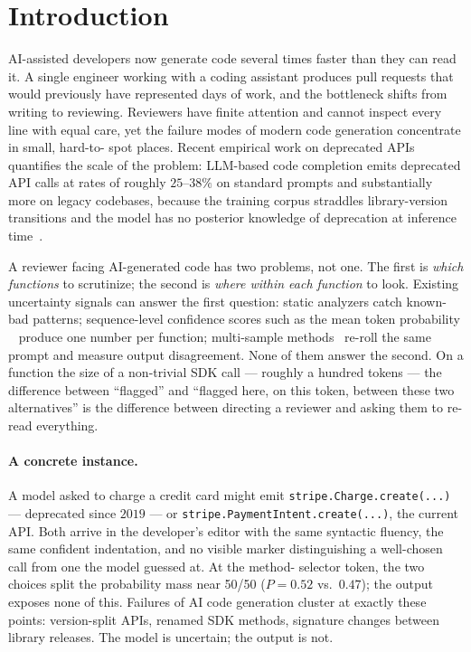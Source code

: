 \section{Introduction}
\label{sec:introduction}

AI-assisted developers now generate code several times faster than they
can read it. A single engineer working with a coding assistant produces
pull requests that would previously have represented days of work, and
the bottleneck shifts from writing to reviewing. Reviewers have finite
attention and cannot inspect every line with equal care, yet the
failure modes of modern code generation concentrate in small, hard-to-%
spot places. Recent empirical work on deprecated APIs quantifies the
scale of the problem: LLM-based code completion emits deprecated API
calls at rates of roughly $25$--$38\%$ on standard prompts and
substantially more on legacy codebases, because the training corpus
straddles library-version transitions and the model has no posterior
knowledge of deprecation at inference time~\cite{wang2025deprecated}.

A reviewer facing AI-generated code has two problems, not one. The
first is \emph{which functions} to scrutinize; the second is \emph{where
within each function} to look. Existing uncertainty signals can answer
the first question: static analyzers catch known-bad patterns;
sequence-level confidence scores such as the mean token probability
\papg~\cite{spiess2025calibration} produce one number per function;
multi-sample methods~\cite{kuhn2023semantic,uqlm2024,sharma2025multisample}
re-roll the same prompt and measure output disagreement. None of them
answer the second. On a function the size of a non-trivial SDK call
--- roughly a hundred tokens --- the difference between ``flagged''
and ``flagged here, on this token, between these two alternatives''
is the difference between directing a reviewer and asking them to
re-read everything.

\paragraph{A concrete instance.}
A model asked to charge a credit card might emit
\texttt{stripe.Charge.create(...)} --- deprecated since $2019$ --- or
\texttt{stripe.PaymentIntent.create(...)}, the current API. Both
arrive in the developer's editor with the same syntactic fluency, the
same confident indentation, and no visible marker distinguishing a
well-chosen call from one the model guessed at. At the method-%
selector token, the two choices split the probability mass near
50/50 ($P=0.52$ vs.\ $0.47$); the output exposes none of this. Failures
of AI code generation cluster at exactly these points: version-split
APIs, renamed SDK methods, signature changes between library releases.
The model is uncertain; the output is not.

